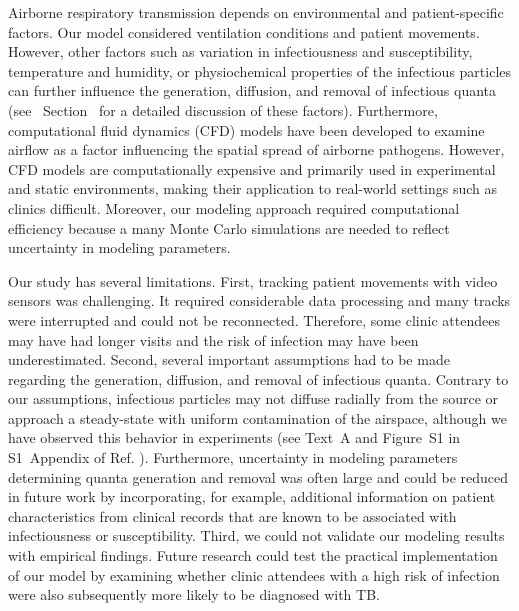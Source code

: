 \documentclass[fleqn,11pt]{wlscirep}
\begin{document}
Airborne respiratory transmission depends on environmental and patient-specific factors.  Our model considered ventilation conditions and patient movements. However, other factors such as variation in infectiousness and susceptibility, temperature and humidity, or physiochemical properties of the infectious particles can further influence the generation, diffusion, and removal of infectious quanta (see \supp~Section~ for a detailed discussion of these factors). Furthermore, computational fluid dynamics (CFD) models have been developed to examine airflow as a factor influencing the spatial spread of airborne pathogens\cite{Vuorinen2020SafSci,Jung2021InfectChemo,Li2021BuildEnv,Yan2023BE,Qian2009BE,Li2022SOTTE}. However, CFD models are computationally expensive and primarily used in experimental and static environments, making their application to real-world settings such as clinics difficult. Moreover, our modeling approach required computational efficiency because a many Monte Carlo simulations are needed to reflect uncertainty in modeling parameters. 

Our study has several limitations. First, tracking patient movements with video sensors was challenging. It required considerable data processing and many tracks were interrupted and could not be reconnected. Therefore, some clinic attendees may have had longer visits and the risk of infection may have been underestimated. Second, several important assumptions had to be made regarding the generation, diffusion, and removal of infectious quanta. Contrary to our assumptions, infectious particles may not diffuse radially from the source or approach a steady-state with uniform contamination of the airspace, although we have observed this behavior in experiments (see Text~A and Figure~S1 in S1~Appendix of Ref. \cite{Banholzer2023PLoSMed}). Furthermore, uncertainty in modeling parameters determining quanta generation and removal was often large and could be reduced in future work by incorporating, for example, additional information on patient characteristics from clinical records that are known to be associated with infectiousness\cite{Escombe2008PLoSMed} or susceptibility\cite{Furin2019Lancet}. Third, we could not validate our modeling results with empirical findings. Future research could test the practical implementation of our model by examining whether clinic attendees with a high risk of infection were also subsequently more likely to be diagnosed with TB.  
\end{document}
